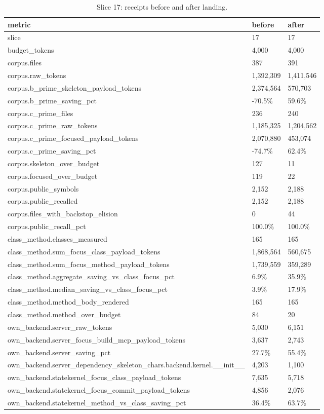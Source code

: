 \documentclass{article}
\begin{document}
\begin{table}[h]
\centering
\begin{tabular}{lll}
\toprule
metric & before & after \\
\midrule
slice & 17 & 17 \\
budget\_tokens & 4,000 & 4,000 \\
corpus.files & 387 & 391 \\
corpus.raw\_tokens & 1,392,309 & 1,411,546 \\
corpus.b\_prime\_skeleton\_payload\_tokens & 2,374,564 & 570,703 \\
corpus.b\_prime\_saving\_pct & -70.5\% & 59.6\% \\
corpus.c\_prime\_files & 236 & 240 \\
corpus.c\_prime\_raw\_tokens & 1,185,325 & 1,204,562 \\
corpus.c\_prime\_focused\_payload\_tokens & 2,070,880 & 453,074 \\
corpus.c\_prime\_saving\_pct & -74.7\% & 62.4\% \\
corpus.skeleton\_over\_budget & 127 & 11 \\
corpus.focused\_over\_budget & 119 & 22 \\
corpus.public\_symbols & 2,152 & 2,188 \\
corpus.public\_recalled & 2,152 & 2,188 \\
corpus.files\_with\_backstop\_elision & 0 & 44 \\
corpus.public\_recall\_pct & 100.0\% & 100.0\% \\
class\_method.classes\_measured & 165 & 165 \\
class\_method.sum\_focus\_class\_payload\_tokens & 1,868,564 & 560,675 \\
class\_method.sum\_focus\_method\_payload\_tokens & 1,739,559 & 359,289 \\
class\_method.aggregate\_saving\_vs\_class\_focus\_pct & 6.9\% & 35.9\% \\
class\_method.median\_saving\_vs\_class\_focus\_pct & 3.9\% & 17.9\% \\
class\_method.method\_body\_rendered & 165 & 165 \\
class\_method.method\_over\_budget & 84 & 20 \\
own\_backend.server\_raw\_tokens & 5,030 & 6,151 \\
own\_backend.server\_focus\_build\_mcp\_payload\_tokens & 3,637 & 2,743 \\
own\_backend.server\_saving\_pct & 27.7\% & 55.4\% \\
own\_backend.server\_dependency\_skeleton\_chars.backend.kernel.\_\_init\_\_ & 4,203 & 1,100 \\
own\_backend.statekernel\_focus\_class\_payload\_tokens & 7,635 & 5,718 \\
own\_backend.statekernel\_focus\_commit\_payload\_tokens & 4,856 & 2,076 \\
own\_backend.statekernel\_method\_vs\_class\_saving\_pct & 36.4\% & 63.7\% \\
\bottomrule
\end{tabular}
\caption{Slice 17: receipts before and after landing.}
\label{tab:slice17}
\end{table}
\end{document}
